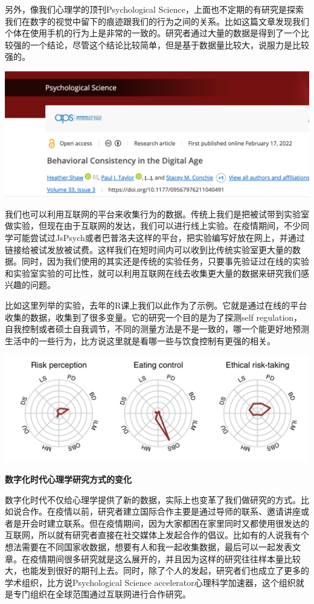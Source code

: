 \documentclass[
  oneside]{book}
\begin{document}
另外，像我们心理学的顶刊Psychological Science，上面也不定期的有研究是探索我们在数字的视觉中留下的痕迹跟我们的行为之间的关系。比如这篇文章发现我们个体在使用手机的行为上是非常的一致的。研究者通过大量的数据是得到了一个比较强的一个结论，尽管这个结论比较简单，但是基于数据量比较大，说服力是比较强的。

\includegraphics{1001-lesson1/image-20230302195243394.png}

我们也可以利用互联网的平台来收集行为的数据。传统上我们是把被试带到实验室做实验，但现在由于互联网的发达，我们可以进行线上实验。在疫情期间，不少同学可能尝试过JsPsych或者巴普洛夫这样的平台，把实验编写好放在网上，并通过链接给被试发放被试费。这样我们在短时间内可以收到比传统实验室更大量的数据。同时，因为我们使用的其实还是传统的实验任务，只要事先验证过在线的实验和实验室实验的可比性，就可以利用互联网在线去收集更大量的数据来研究我们感兴趣的问题。

比如这里列举的实验，去年的R课上我们以此作为了示例。它就是通过在线的平台收集的数据，收集到了很多变量。它的研究一个目的是为了探测self regulation，自我控制或者硕士自我调节，不同的测量方法是不是一致的，哪一个能更好地预测生活中的一些行为，比方说这里就是看哪一些与饮食控制有更强的相关。

\includegraphics{1001-lesson1/image-20230302195303677.png}

\textbf{数字化时代心理学研究方式的变化}

数字化时代不仅给心理学提供了新的数据，实际上也变革了我们做研究的方式。比如说合作。在疫情以前，研究者建立国际合作主要是通过导师的联系、邀请讲座或者是开会时建立联系。但在疫情期间，因为大家都困在家里同时又都使用很发达的互联网，所以就有研究者直接在社交媒体上发起合作的倡议。比如有的人说我有个想法需要在不同国家收数据，想要有人和我一起收集数据，最后可以一起发表文章。在疫情期间很多研究就是这么展开的，并且因为这样的研究往往样本量比较大，也能发到很好的期刊上去。同时，除了个人的发起，研究者们也成立了更多的学术组织，比方说Psychological Science accelerator心理科学加速器，这个组织就是专门组织在全球范围通过互联网进行合作研究。
\end{document}
